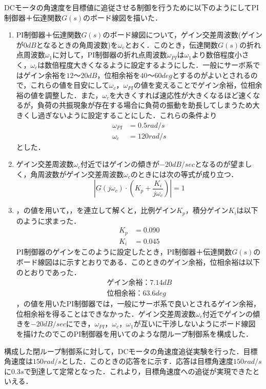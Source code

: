 \newpage

DCモータの角速度を目標値に追従させる制御を行うために以下のようにしてPI制御器＋伝達関数$G(s)$のボード線図を描いた．

\begin{enumerate}
\item PI制御器＋伝達関数$G(s)$のボード線図について，ゲイン交差周波数(ゲインが$0\unit{dB}$となるときの角周波数)を$\omega_{c}$とおく．このとき，伝達関数$G(s)$の折れ点周波数$\omega_{1}$に対して，PI制御器の折れ点周波数$\omega_{PI}$は$\omega_{1}$より数倍程度小さく，$\omega_{c}$は数倍程度大きくなるように設定するようにした．一般にサーボ系ではゲイン余裕を$12〜20\unit{dB}$，位相余裕を$40〜60\unit{deg}$とするのがよいとされるので，これらの値を目安にして$\omega_{c}$，$\omega_{PI}$の値を変えることでゲイン余裕，位相余裕の値を調整した．また，$\omega_{c}$を大きくすれば速応性が大きくなるほど速くなるが，負荷の共振現象が存在する場合に負荷の振動を助長してしまうため大きくし過ぎないように設定することにした．これらの条件より
\begin{align}
 \omega_{PI}&=0.5\unit{rad/s}\label{eq::omega_PI_value}\\
 \omega_{c}&=120\unit{rad/s}\label{eq::omega_c_value}
\end{align}
とした．
\item ゲイン交差周波数$\omega_{c}$付近ではゲインの傾きが$-20\unit{dB/sec}$となるのが望ましく，角周波数がゲイン交差周波数$\omega_{c}$のときには次の等式が成り立つ．
\begin{equation}
|G(j\omega_{c})\cdot(K_{p}+\frac{K_{i}}{j\omega_{c}})|=1\label{eq::omega_c_1}
\end{equation}
\item {}，の値を用いて，，を連立して解くと，比例ゲイン$K_{p}$，積分ゲイン$K_{i}$は以下のように求まった．
\begin{align}
K_{p}&=0.090\label{eq::K_p_value}\\
K_{i}&=0.045\label{eq::K_i_value}
\end{align}
PI制御器のゲインをこのように設定したとき，PI制御器＋伝達関数$G(s)$のボード線図はに示すとおりである．このときのゲイン余裕，位相余裕は以下のとおりであった．
\begin{align}
ゲイン余裕：7.14\unit{dB}\\
位相余裕：63.6\unit{deg}
\end{align}
，の値を用いたPI制御器では，一般にサーボ系で良いとされるゲイン余裕，位相余裕を得ることはできなかった．ゲイン交差周波数$\omega_{c}$付近でゲインの傾きを$-20\unit{dB/sec}$にでき，$\omega_{PI}$，$\omega_{c}$，$\omega_{1}$が互いに干渉しないようにボード線図を描けたのでこのPI制御器を用いてのような閉ループ制御系を構成した．
\end{enumerate}
構成した閉ループ制御系に対して，DCモータの角速度追従実験を行った．目標角速度は$150\unit{rad/s}$とした．このときの応答をに示す．応答は目標角速度$150\unit{rad/s}$に$0.3\unit{s}$で到達して定常となった．これより，目標角速度への追従が実現できたといえる．

